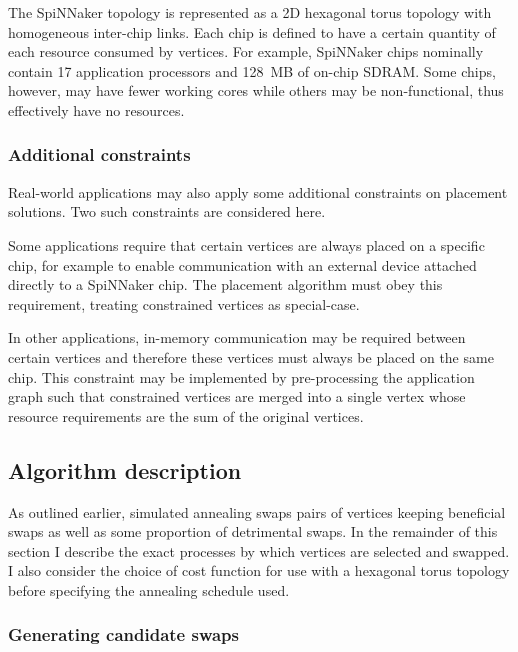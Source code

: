			The SpiNNaker topology is represented as a 2D hexagonal torus topology
			with homogeneous inter-chip links. Each chip is defined to have a certain
			quantity of each resource consumed by vertices. For example, SpiNNaker
			chips nominally contain 17 application processors and 128~MB of on-chip
			SDRAM. Some chips, however, may have fewer working cores while others may
			be non-functional, thus effectively have no resources.
			
			\subsubsection{Additional constraints}
				
				Real-world applications may also apply some additional constraints on
				placement solutions. Two such constraints are considered here.
				
				Some applications require that certain vertices are always placed on a
				specific chip, for example to enable communication with an external
				device attached directly to a SpiNNaker chip. The placement algorithm
				must obey this requirement, treating constrained vertices as
				special-case.
				
				In other applications, in-memory communication may be required between
				certain vertices and therefore these vertices must always be placed on
				the same chip. This constraint may be implemented by pre-processing the
				application graph such that constrained vertices are merged into a
				single vertex whose resource requirements are the sum of the original
				vertices.
		
		\subsection{Algorithm description}
			
			As outlined earlier, simulated annealing swaps pairs of vertices keeping
			beneficial swaps as well as some proportion of detrimental swaps. In the
			remainder of this section I describe the exact processes by which
			vertices are selected and swapped. I also consider the choice of cost
			function for use with a hexagonal torus topology before specifying the
			annealing schedule used.
		
			\subsubsection{Generating candidate swaps}
				
